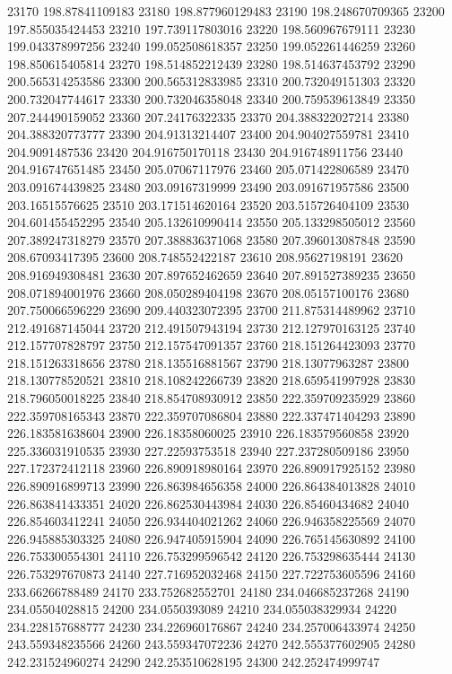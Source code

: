{23170 198.87841109183
23180 198.877960129483
23190 198.248670709365
23200 197.855035424453
23210 197.739117803016
23220 198.560967679111
23230 199.043378997256
23240 199.052508618357
23250 199.052261446259
23260 198.850615405814
23270 198.514852212439
23280 198.514637453792
23290 200.565314253586
23300 200.565312833985
23310 200.732049151303
23320 200.732047744617
23330 200.732046358048
23340 200.759539613849
23350 207.244490159052
23360 207.24176322335
23370 204.388322027214
23380 204.388320773777
23390 204.91313214407
23400 204.904027559781
23410 204.9091487536
23420 204.916750170118
23430 204.916748911756
23440 204.916747651485
23450 205.07067117976
23460 205.071422806589
23470 203.091674439825
23480 203.09167319999
23490 203.091671957586
23500 203.16515576625
23510 203.171514620164
23520 203.515726404109
23530 204.601455452295
23540 205.132610990414
23550 205.133298505012
23560 207.389247318279
23570 207.388836371068
23580 207.396013087848
23590 208.67093417395
23600 208.748552422187
23610 208.95627198191
23620 208.916949308481
23630 207.897652462659
23640 207.891527389235
23650 208.071894001976
23660 208.050289404198
23670 208.05157100176
23680 207.750066596229
23690 209.440323072395
23700 211.875314489962
23710 212.491687145044
23720 212.491507943194
23730 212.127970163125
23740 212.157707828797
23750 212.157547091357
23760 218.151264423093
23770 218.151263318656
23780 218.135516881567
23790 218.13077963287
23800 218.130778520521
23810 218.108242266739
23820 218.659541997928
23830 218.796050018225
23840 218.854708930912
23850 222.359709235929
23860 222.359708165343
23870 222.359707086804
23880 222.337471404293
23890 226.183581638604
23900 226.18358060025
23910 226.183579560858
23920 225.336031910535
23930 227.22593753518
23940 227.237280509186
23950 227.172372412118
23960 226.890918980164
23970 226.890917925152
23980 226.890916899713
23990 226.863984656358
24000 226.864384013828
24010 226.863841433351
24020 226.862530443984
24030 226.85460434682
24040 226.854603412241
24050 226.934404021262
24060 226.946358225569
24070 226.945885303325
24080 226.947405915904
24090 226.765145630892
24100 226.753300554301
24110 226.753299596542
24120 226.753298635444
24130 226.753297670873
24140 227.716952032468
24150 227.722753605596
24160 233.66266788489
24170 233.752682552701
24180 234.046685237268
24190 234.05504028815
24200 234.0550393089
24210 234.055038329934
24220 234.228157688777
24230 234.226960176867
24240 234.257006433974
24250 243.559348235566
24260 243.559347072236
24270 242.555377602905
24280 242.231524960274
24290 242.253510628195
24300 242.252474999747
}
